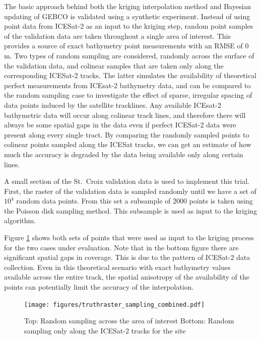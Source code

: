 The basic approach behind both the kriging interpolation method and Bayesian updating of GEBCO is validated using a synthetic experiment. Instead of using point data from ICESat-2 as an input to the kriging step, random point samples of the validation data are taken throughout a single area of interest. This provides a source of exact bathymetry point measurements with an RMSE of 0 m. Two types of random sampling are considered, randomly across the surface of the validation data, and colinear samples that are taken only along the corresponding ICESat-2 tracks. The latter simulates the availability of theoretical perfect measurements from ICEsat-2 bathymetry data, and can be compared to the random sampling case to investigate the effect of sparse, irregular spacing of data points induced by the satellite tracklines. Any available ICEsat-2 bathymetric data will occur along colinear track lines, and therefore there will always be some spatial gaps in the data even if perfect ICESat-2 data were present along every single tract. By comparing the randomly sampled points to colinear points sampled along the ICESat tracks, we can get an estimate of how much the accuracy is degraded by the data being available only along certain lines.

A small section of the St.~Croix validation data is used to implement this trial. First, the raster of the validation data is sampled randomly until we have a set of $10^4$ random data points. From this set a subsample of $2000$ points is taken using the Poisson disk sampling method. This subsample is used as input to the kriging algorithm.

Figure \ref{fig:truthras-sampling} shows both sets of points that were used as input to the kriging process for the two cases under evaluation. Note that in the bottom figure  there are significant spatial gaps in coverage. This is due to the pattern of ICESat-2 data collection. Even in this theoretical scenario with exact bathymetry values available across the entire track, the spatial anisotropy of the availability of the points can potentially limit the accuracy of the interpolation.

\begin{figure}[h]
    \centering
    \texttt{[image: figures/truthraster\_sampling\_combined.pdf]}
    \caption[Random sampling points for validation test]{Top: Random sampling across the area of interest \newline   Bottom: Random sampling only along the ICESat-2 tracks for the site}
    \label{fig:truthras-sampling}
\end{figure}


